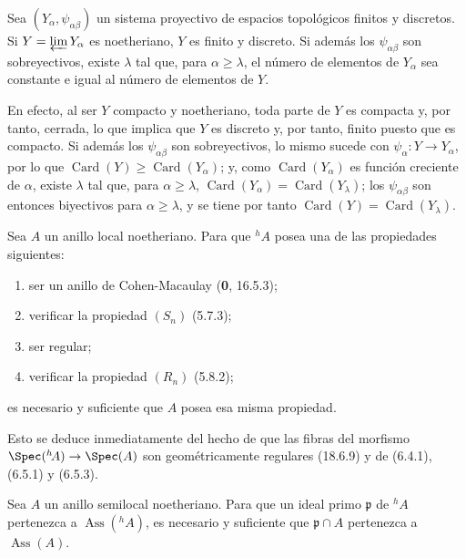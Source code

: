 \begin{lemma}[18.6.9.2]
\label{IV.18.6.9.2}
Sea $(Y_\alpha,\psi_{\alpha\beta})$ un sistema proyectivo de espacios topológicos finitos y discretos. Si $Y=\varprojlim Y_\alpha$ es noetheriano, $Y$ es finito y discreto. Si además los $\psi_{\alpha\beta}$ son sobreyectivos, existe $\lambda$ tal que, para $\alpha\geq\lambda$, el número de elementos de $Y_\alpha$ sea constante e igual al número de elementos de $Y$.
\end{lemma}

En efecto, al ser $Y$ compacto y noetheriano, toda parte de $Y$ es compacta y, por tanto, cerrada, lo que implica que $Y$ es discreto y, por tanto, finito puesto que es compacto. Si además los $\psi_{\alpha\beta}$ son sobreyectivos, lo mismo sucede con $\psi_\alpha:Y\to Y_\alpha$, por lo que $\operatorname{Card}(Y)\geq\operatorname{Card}(Y_\alpha)$; y, como $\operatorname{Card}(Y_\alpha)$ es función creciente de $\alpha$, existe $\lambda$ tal que, para $\alpha\geq\lambda$, $\operatorname{Card}(Y_\alpha)=\operatorname{Card}(Y_\lambda)$; los $\psi_{\alpha\beta}$ son entonces biyectivos para $\alpha\geq\lambda$, y se tiene por tanto $\operatorname{Card}(Y)=\operatorname{Card}(Y_\lambda)$.

\begin{corollary}[18.6.10]
\label{IV.18.6.10}
Sea $A$ un anillo local noetheriano. Para que ${}^h\!A$ posea una de las propiedades siguientes:
\begin{enumerate}
  \item[\textup{a)}] ser un anillo de Cohen-Macaulay \textup{(\textbf{0}, 16.5.3)};
  \item[\textup{b)}] verificar la propiedad $(S_n)$ \textup{(5.7.3)};
  \item[\textup{c)}] ser regular;
  \item[\textup{d)}] verificar la propiedad $(R_n)$ \textup{(5.8.2)};
\end{enumerate}
es necesario y suficiente que $A$ posea esa misma propiedad.
\end{corollary}


Esto se deduce inmediatamente del hecho de que las fibras del morfismo $\Spec({}^h\!A)\to\Spec(A)$ son geométricamente regulares (18.6.9) y de (6.4.1), (6.5.1) y (6.5.3).

\begin{corollary}[18.6.11]
\label{IV.18.6.11}
Sea $A$ un anillo semilocal noetheriano. Para que un ideal primo $\mathfrak p$ de ${}^h\!A$ pertenezca a $\operatorname{Ass}({}^h\!A)$, es necesario y suficiente que $\mathfrak p\cap A$ pertenezca a $\operatorname{Ass}(A)$.
\end{corollary}

